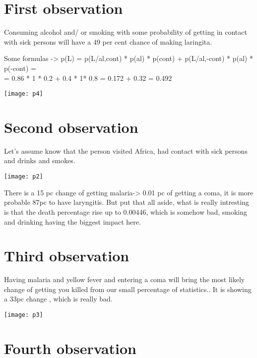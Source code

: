 \section {First observation}

\tab Consuming alcohol and/ or smoking with some probability of getting in contact with sick persons will have a 49 per cent chance of making laringita.

\tab Some formulas ->
	\tab p(L) = p(L/al,cont) * p(al) *  p(cont) + p(L/al,-cont) * p(al) * p(-cont) =\\
		\tab	= 0.86 * 1 * 0.2 + 0.4 * 1* 0.8 = 0.172 + 0.32 = 0.492\\

\begin{center}
  	\texttt{[image: p4]}
\end{center}


\section{Second observation}

\tab Let's assume know that the person visited Africa, had contact with sick persons and drinks and smokes.

\begin{center}
  	\texttt{[image: p2]}
\end{center}

\tab There is a 15 pc change of getting malaria-> 0.01 pc of getting a coma, it is more probable 87pc to have laryngitis. But put that all aside, what is really intresting is that the death percentage rise up to 0.00446, which is somehow bad, smoking and drinking having the biggest impact here.\\

\section {Third observation}

\tab Having malaria and yellow fever and entering a coma will bring the most likely change of getting you killed from our small percentage of statistics.. It is showing a 33pc change , which is really bad.

\begin{center}
  	\texttt{[image: p3]}
\end{center}


\section{Fourth observation}

